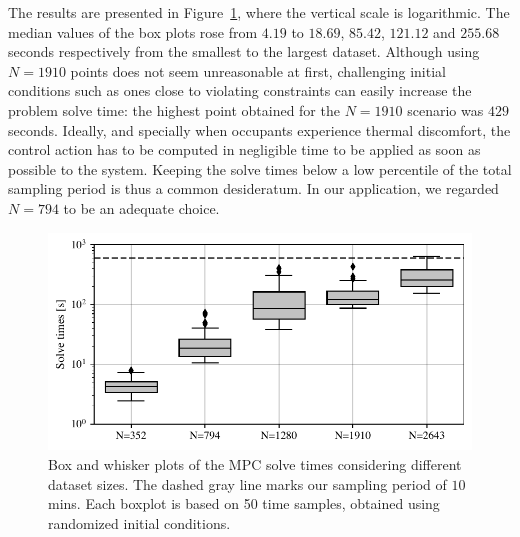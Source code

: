 The results are presented in Figure~\ref{fig.runTimes}, where the vertical scale is logarithmic. The median values of the box plots rose from $4.19$ to $18.69$, $85.42$, $121.12$ and $255.68$ seconds respectively from the smallest to the largest dataset. Although using $N=1910$ points does not seem unreasonable at first, challenging initial conditions such as ones close to violating constraints can easily increase the problem solve time: the highest point obtained for the $N=1910$ scenario was $429$ seconds. Ideally, and specially when occupants experience thermal discomfort, the control action has to be computed in negligible time to be applied as soon as possible to the system. Keeping the solve times below a low percentile of the total sampling period is thus a common desideratum. In our application, we regarded $N=794$ to be an adequate choice.

\begin{figure}[!t]
	\hspace{6pt}
	\includegraphics[scale=0.55]{../images/chap3_warm_start.pdf}
	\caption{Box and whisker plots of the MPC solve times considering different dataset sizes. The dashed gray line marks our sampling period of $10\,$mins. Each boxplot is based on 50 time samples, obtained using randomized initial conditions.}
	\label{fig.runTimes}
\end{figure}
